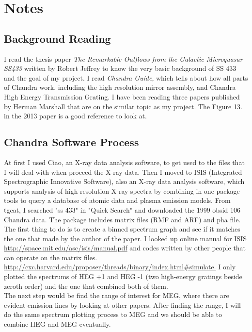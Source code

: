 \chapter{Notes}
\section{Background Reading}
I read the thesis paper \textit{The Remarkable Outflows from the Galactic Microquasar SS433} written by Robert Jeffrey to know the very basic background of SS 433 and the goal of my project. I read \textit{Chandra Guide}, which tells about how all parts of Chandra work, including the high resolution mirror assembly, and Chandra High Energy Transmission Grating. I have been reading three papers published by Herman Marshall that are on the similar topic as my project. The Figure 13. in the 2013 paper is a good reference to look at.  










\section{Chandra Software Process}
At first I used Ciao, an X-ray data analysis software, to get used to the files that I will deal with when proceed the X-ray data. Then I moved to ISIS (Integrated Spectrographic Innovative Software), also an X-ray data analysis software, which supports analysis of high resolution X-ray spectra by combining in one
package tools to query a database of atomic data and plasma emission models. 
From tgcat, I searched "ss 433" in "Quick Search" and downloaded the 1999 obsid 106 Chandra data. The package includes matrix files (RMF and ARF) and pha file. The first thing to do is to create a binned spectrum graph and see if it matches the one that made by the author of the paper. I looked up online manual for ISIS \url{http://space.mit.edu/asc/isis/manual.pdf} and codes written by other people that can operate on the matrix files. \url{http://cxc.harvard.edu/proposer/threads/binary/index.html#simulate.}
I only plotted the spectrums of HEG +1 and HEG -1 (two high-energy gratings beside zeroth order) and the one that combined both of them. \\
The next step would be find the range of interest for MEG, where there are evident emission lines by looking at other papers. After finding the range, I will do the same spectrum plotting process to MEG and we should be able to combine HEG and MEG eventually.

